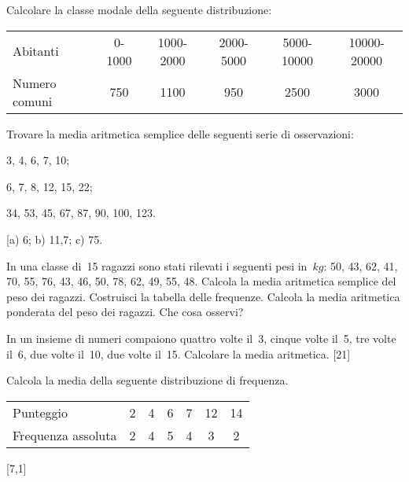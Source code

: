 \begin{esercizio}
\label{ese:A.23}
Calcolare la classe modale della seguente distribuzione:
\begin{center}
\begin{tabular}{l*{5}{c}}
\toprule
Abitanti & 0-1000& 1000-2000& 2000-5000 & 5000-10000& 10000-20000 \\
Numero comuni & 750 & 1100 & 950 & 2500 & 3000 \\
\bottomrule
\end{tabular}
\end{center}
\end{esercizio}

\begin{esercizio}[\Ast]
\label{ese:A.24}
Trovare la media aritmetica semplice delle seguenti serie di osservazioni:
\begin{multicols}{3}
\begin{enumeratea}
 \item 3, 4, 6, 7, 10;
 \item 6, 7, 8, 12, 15, 22;
 \item 34, 53, 45, 67, 87, 90, 100, 123.
\end{enumeratea}
\end{multicols}
\hfill [a) 6; \quad b) 11,7; \quad c) 75.
\end{esercizio}

\begin{esercizio}
\label{ese:A.25}
In una classe di~15 ragazzi sono stati rilevati i seguenti pesi 
in~\(\unit{kg}\):
50, 43, 62, 41, 70, 55, 76, 43, 46, 50, 78, 62, 49, 55, 48.
Calcola la media aritmetica semplice del peso dei ragazzi. Costruisci la 
tabella delle frequenze.
Calcola la media aritmetica ponderata del peso dei ragazzi. Che cosa 
osservi?
\end{esercizio}

\begin{esercizio}[\Ast]
\label{ese:A.26}
In un insieme di numeri compaiono quattro volte il~3, cinque volte il~5, 
tre volte il~6, due volte il~10, due volte il~15. Calcolare la media 
aritmetica.
\hfill [21]
\end{esercizio}

\begin{esercizio}[\Ast]
\label{ese:A.27}
Calcola la media della seguente distribuzione di frequenza.
\begin{center}
 \begin{tabular}{l*{6}{c}}
\toprule
Punteggio & 2 & 4 & 6 & 7 & 12 & 14 \\
Frequenza assoluta & 2 & 4 & 5 & 4 & 3 & 2 \\
\bottomrule
\end{tabular}
\end{center}
\hfill [7,1]
\end{esercizio}

